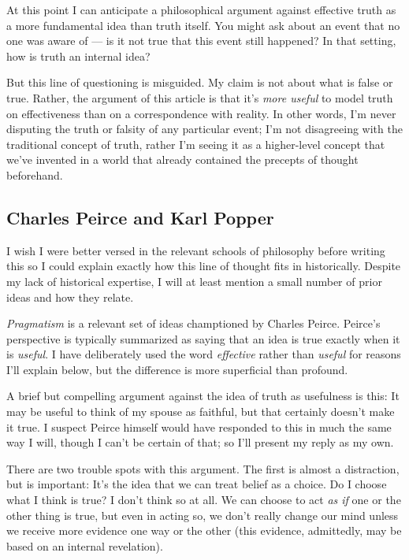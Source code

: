 \documentclass[20pt,]{extarticle}
\begin{document}
At this point I can anticipate a philosophical argument against
effective truth as a more fundamental idea than truth itself. You might
ask about an event that no one was aware of --- is it not true that this
event still happened? In that setting, how is truth an internal idea?

But this line of questioning is misguided. My claim is not about what is
false or true. Rather, the argument of this article is that it's
\emph{more useful} to model truth on effectiveness than on a
correspondence with reality. In other words, I'm never disputing the
truth or falsity of any particular event; I'm not disagreeing with the
traditional concept of truth, rather I'm seeing it as a higher-level
concept that we've invented in a world that already contained the
precepts of thought beforehand.

\subsection{Charles Peirce and Karl
Popper}\label{charles-peirce-and-karl-popper}

I wish I were better versed in the relevant schools of philosophy before
writing this so I could explain exactly how this line of thought fits in
historically. Despite my lack of historical expertise, I will at least
mention a small number of prior ideas and how they relate.

\emph{Pragmatism} is a relevant set of ideas champtioned by Charles
Peirce. Peirce's perspective is typically summarized as saying that an
idea is true exactly when it is \emph{useful}. I have deliberately used
the word \emph{effective} rather than \emph{useful} for reasons I'll
explain below, but the difference is more superficial than profound.

A brief but compelling argument against the idea of truth as usefulness
is this: It may be useful to think of my spouse as faithful, but that
certainly doesn't make it true. I suspect Peirce himself would have
responded to this in much the same way I will, though I can't be certain
of that; so I'll present my reply as my own.

There are two trouble spots with this argument. The first is almost a
distraction, but is important: It's the idea that we can treat belief as
a choice. Do I choose what I think is true? I don't think so at all. We
can choose to act \emph{as if} one or the other thing is true, but even
in acting so, we don't really change our mind unless we receive more
evidence one way or the other (this evidence, admittedly, may be based
on an internal revelation).
\end{document}
